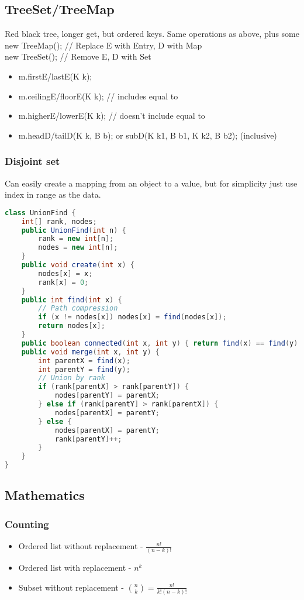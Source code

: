 \documentclass[10pt]{article}
\begin{document}
\subsection{TreeSet/TreeMap}
Red black tree, longer get, but ordered keys. Same operations as above, plus some\\
new TreeMap(); // Replace E with Entry, D with Map\\
new TreeSet(); // Remove E, D with Set
\begin{itemize}
    \item m.firstE/lastE(K k);
    \item m.ceilingE/floorE(K k); // includes equal to
    \item m.higherE/lowerE(K k); // doesn't include equal to
    \item m.headD/tailD(K k, B b); or subD(K k1, B b1, K k2, B b2); (inclusive)
\end{itemize}

\subsubsection{Disjoint set}
Can easily create a mapping from an object to a value, but for simplicity just use index in range as the data.
\begin{lstlisting}[language=java]
class UnionFind {
    int[] rank, nodes;
    public UnionFind(int n) {
        rank = new int[n];
        nodes = new int[n];
    }
    public void create(int x) {
        nodes[x] = x;
        rank[x] = 0;
    }
    public int find(int x) {
        // Path compression
        if (x != nodes[x]) nodes[x] = find(nodes[x]);
        return nodes[x];
    }
    public boolean connected(int x, int y) { return find(x) == find(y); }
    public void merge(int x, int y) {
        int parentX = find(x);
        int parentY = find(y);
        // Union by rank
        if (rank[parentX] > rank[parentY]) {
            nodes[parentY] = parentX;
        } else if (rank[parentY] > rank[parentX]) {
            nodes[parentX] = parentY;
        } else {
            nodes[parentX] = parentY;
            rank[parentY]++;
        }
    }
}
\end{lstlisting}

\subsection{Mathematics}
\subsubsection{Counting}
\begin{itemize}
    \item Ordered list without replacement - $\frac{n!}{(n-k)!}$
    \item Ordered list with replacement - $n^k$
    \item Subset without replacement - $\binom{n}{k} = \frac{n!}{k!(n-k)!}$
\end{itemize}
\end{document}
